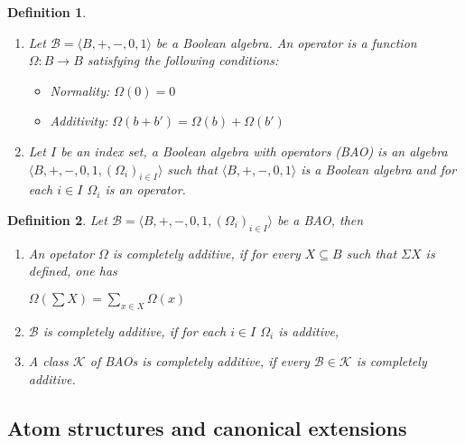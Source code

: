 \documentclass[a4paper]{article}
\theoremstyle{defin}
\newtheorem{defin}{Definition}
\theoremstyle{theorem}
\theoremstyle{prop}
\theoremstyle{lemma}
\theoremstyle{fact}
\theoremstyle{ex}
\theoremstyle{col}
\begin{document}
\begin{defin}

$ $

  \begin{enumerate}
    \item Let $\mathcal{B} = \langle B, +, -, 0, 1 \rangle$ be a Boolean algebra. An operator is a function $\Omega : B \to B$ satisfying the following conditions:
    \begin{itemize}
      \item Normality: $\Omega(0) = 0$
      \item Additivity: $\Omega(b + b') = \Omega(b) + \Omega(b')$
    \end{itemize}
    \item Let $I$ be an index set, a Boolean algebra with operators (BAO) is an algebra $\langle B, +, -, 0, 1, (\Omega_{i})_{i \in I} \rangle$ such that $\langle B, +, -, 0, 1 \rangle$ is a Boolean algebra and for each $i \in I$ $\Omega_{i}$ is an operator.
  \end{enumerate}
\end{defin}

\begin{defin} Let $\mathcal{B} = \langle B, +, -, 0, 1, (\Omega_{i})_{i \in I} \rangle$ be a BAO, then

  \begin{enumerate}
    \item An opetator $\Omega$ is completely additive, if for every $X \subseteq B$ such that $\Sigma X$ is defined, one has

    \begin{center}
      $\Omega(\sum X) = \sum \limits_{x \in X} \Omega(x)$
    \end{center}
    \item $\mathcal{B}$ is completely additive, if for each $i \in I$ $\Omega_{i}$ is additive,
    \item A class $\mathcal{K}$ of BAOs is completely additive, if every $\mathcal{B} \in \mathcal{K}$ is completely additive.
  \end{enumerate}
\end{defin}

\subsection{Atom structures and canonical extensions}
\end{document}

